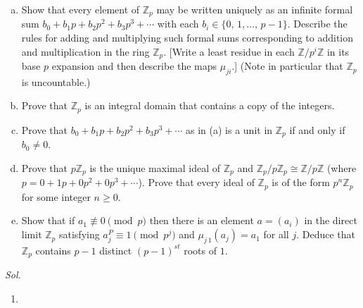 \documentclass{article}
\theoremstyle{definition}
\theoremstyle{remark}
\begin{document}
\begin{enumerate}[(a)]
    \item Show that every element of $\mathbb{Z}_{p}$ may be written uniquely as an infinite formal sum $b_{0}+b_{1}p+b_{2}p^{2}+b_{3}p^{3}+\cdots$ with each $b_{i}\in\{0,\,1,\ldots,\,p-1\}$. Describe the rules for adding and multiplying such formal sums corresponding to addition and multiplication in the ring $\mathbb{Z}_{p}$. [Write a least residue in each $\mathbb{Z}/p^{i}\mathbb{Z}$ in its base $p$ expansion and then describe the maps $\mu_{ji}$.] (Note in particular that $\mathbb{Z}_{p}$ is uncountable.)

    \item Prove that $\mathbb{Z}_{p}$ is an integral domain that contains a copy of the integers.

    \item Prove that $b_{0}+b_{1}p+b_{2}p^{2}+b_{3}p^{3}+\cdots$ as in (a) is a unit in $\mathbb{Z}_{p}$ if and only if $b_{0}\neq 0$.

    \item Prove that $p\mathbb{Z}_{p}$ is the unique maximal ideal of $\mathbb{Z}_{p}$ and $\mathbb{Z}_{p}/p\mathbb{Z}_{p}\cong\mathbb{Z}/p\mathbb{Z}$ (where $p=0+1p+0p^{2}+0p^{3}+\cdots$). Prove that every ideal of $\mathbb{Z}_{p}$ is of the form $p^{n}\mathbb{Z}_{p}$ for some integer $n\geq 0$.

    \item Show that if $a_{1}\not\equiv 0\pmod{p}$ then there is an element $a=(a_{i})$ in the direct limit $\mathbb{Z}_{p}$ satisfying $a_{j}^{P}\equiv 1\pmod{p^{j}}$ and $\mu_{j\,1}(a_{j})=a_{1}$ for all $j$. Deduce that $\mathbb{Z}_{p}$ contains $p-1$ distinct $(p-1)^{st}$ roots of $1$.
\end{enumerate}

\textit{ Sol. }
\begin{enumerate}
    \item 
\end{enumerate}
\end{document}
